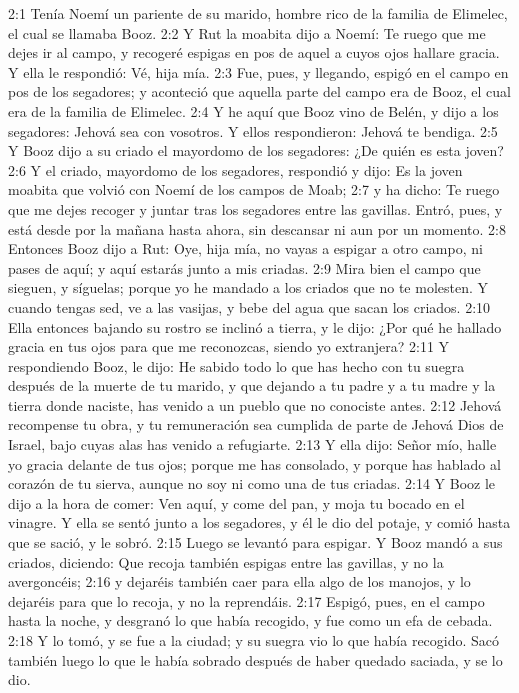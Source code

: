 2:1 Tenía Noemí un pariente de su marido, hombre rico de la familia de Elimelec, el cual se llamaba Booz.  
2:2 Y Rut la moabita dijo a Noemí: Te ruego que me dejes ir al campo, y recogeré espigas en pos de aquel a cuyos ojos hallare gracia. Y ella le respondió: Vé, hija mía.  
2:3 Fue, pues, y llegando, espigó en el campo en pos de los segadores; y aconteció que aquella parte del campo era de Booz, el cual era de la familia de Elimelec.  
2:4 Y he aquí que Booz vino de Belén, y dijo a los segadores: Jehová sea con vosotros. Y ellos respondieron: Jehová te bendiga.  
2:5 Y Booz dijo a su criado el mayordomo de los segadores: ¿De quién es esta joven?  
2:6 Y el criado, mayordomo de los segadores, respondió y dijo: Es la joven moabita que volvió con Noemí de los campos de Moab;  
2:7 y ha dicho: Te ruego que me dejes recoger y juntar tras los segadores entre las gavillas. Entró, pues, y está desde por la mañana hasta ahora, sin descansar ni aun por un momento.  
2:8 Entonces Booz dijo a Rut: Oye, hija mía, no vayas a espigar a otro campo, ni pases de aquí; y aquí estarás junto a mis criadas.  
2:9 Mira bien el campo que sieguen, y síguelas; porque yo he mandado a los criados que no te molesten. Y cuando tengas sed, ve a las vasijas, y bebe del agua que sacan los criados.  
2:10 Ella entonces bajando su rostro se inclinó a tierra, y le dijo: ¿Por qué he hallado gracia en tus ojos para que me reconozcas, siendo yo extranjera?  
2:11 Y respondiendo Booz, le dijo: He sabido todo lo que has hecho con tu suegra después de la muerte de tu marido, y que dejando a tu padre y a tu madre y la tierra donde naciste, has venido a un pueblo que no conociste antes.  
2:12 Jehová recompense tu obra, y tu remuneración sea cumplida de parte de Jehová Dios de Israel, bajo cuyas alas has venido a refugiarte.  
2:13 Y ella dijo: Señor mío, halle yo gracia delante de tus ojos; porque me has consolado, y porque has hablado al corazón de tu sierva, aunque no soy ni como una de tus criadas.  
2:14 Y Booz le dijo a la hora de comer: Ven aquí, y come del pan, y moja tu bocado en el vinagre. Y ella se sentó junto a los segadores, y él le dio del potaje, y comió hasta que se sació, y le sobró.  
2:15 Luego se levantó para espigar. Y Booz mandó a sus criados, diciendo: Que recoja también espigas entre las gavillas, y no la avergoncéis;  
2:16 y dejaréis también caer para ella algo de los manojos, y lo dejaréis para que lo recoja, y no la reprendáis.  
2:17 Espigó, pues, en el campo hasta la noche, y desgranó lo que había recogido, y fue como un efa   de cebada.  
2:18 Y lo tomó, y se fue a la ciudad; y su suegra vio lo que había recogido. Sacó también luego lo que le había sobrado después de haber quedado saciada, y se lo dio.  
